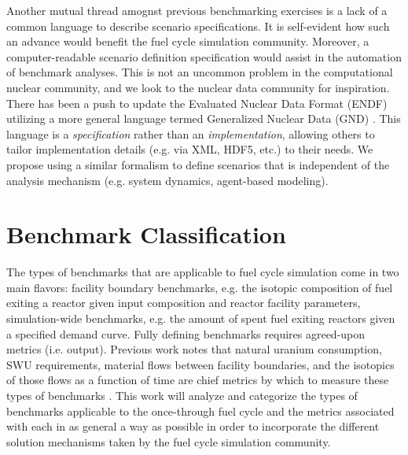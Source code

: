 \documentclass{anstrans}
\begin{document}
Another mutual thread amognst previous benchmarking exercises is a 
lack of a common language to describe scenario specifications. It is
self-evident how such an advance would benefit the fuel cycle 
simulation community. Moreover, a computer-readable scenario 
definition specification would assist in the automation of benchmark
analyses. This is not an uncommon problem in the computational 
nuclear community, and we look to the nuclear data community for 
inspiration. There has been a push to update the Evaluated Nuclear
Data Format (ENDF) utilizing a more general language termed 
Generalized Nuclear Data (GND) \cite{mattoon_generalized_2012}. This
language is a \emph{specification} rather than an 
\emph{implementation}, allowing others to tailor implementation 
details (e.g. via XML, HDF5, etc.) to their needs. We propose using a 
similar formalism to define scenarios that is independent of the 
analysis mechanism (e.g. system dynamics, agent-based modeling).

\section{Benchmark Classification}
The types of benchmarks that are applicable to fuel cycle simulation
come in two main flavors: facility boundary benchmarks, e.g. the
isotopic composition of fuel exiting a reactor given input composition
and reactor facility parameters, simulation-wide benchmarks, e.g. the
amount of spent fuel exiting reactors given a specified demand curve.
Fully defining benchmarks requires agreed-upon metrics (i.e. output).
Previous work notes that natural uranium consumption, SWU 
requirements, material flows between facility boundaries, and the 
isotopics of those flows as a function of time are chief metrics by
which to measure these types of benchmarks 
\cite{boucher_specification_2008}. This work will analyze and 
categorize the types of benchmarks applicable to the once-through 
fuel cycle and the metrics associated with each in as general a way
as possible in order to incorporate the different solution mechanisms
taken by the fuel cycle simulation community.

\end{document}
